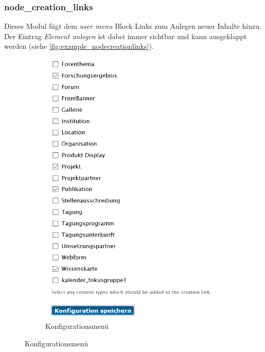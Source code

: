 \newpage
\subsubsection{node\_creation\_links}\label{subsub:nodecreationlinks}
Dieses Modul fügt dem \textit{user menu} Block Links zum Anlegen neuer Inhalte hinzu. Der Eintrag \textit{Element anlegen} ist dabei immer sichtbar und kann ausgeklappt werden (siehe \cref{fig:example_nodecreationlinks}).

\begin{figure}[H]
	\centering
	\begin{subfigure}[b]{0.4\textwidth}
		\centering
		\includegraphics[height=0.20\textheight]{images/config_nodecreationlinks}
		\caption[]{Konfigurationsmenü}
		\label{fig:config_nodecreationlinks}
	\end{subfigure}

\end{figure}
